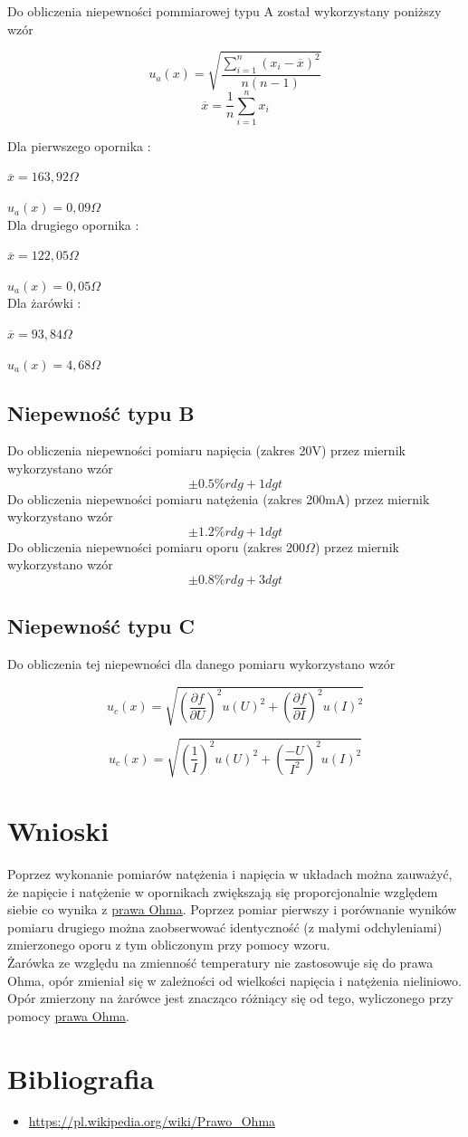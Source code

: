 \documentclass[12pt]{article}
\begin{document}
Do obliczenia niepewności pommiarowej typu A został wykorzystany poniższy wzór

$$ u_a(x) = \sqrt{\frac{\sum\limits_{i=1}^{n}(x_i - \overline{x})^2}{n(n - 1)}} $$
$$ \overline{x} = \frac{1}{n}\sum\limits_{i = 1}^{n}x_i $$

Dla pierwszego opornika : 

$ \overline{x} = 163,92\Omega $

$ u_a(x) = 0,09\Omega $\\

Dla drugiego opornika : 

$ \overline{x} = 122,05\Omega $

$ u_a(x) = 0,05\Omega $\\

Dla żarówki : 

$ \overline{x} = 93,84\Omega $

$ u_a(x) = 4,68\Omega $

\subsection{Niepewność typu B}

Do obliczenia niepewności pomiaru napięcia (zakres 20V) przez miernik wykorzystano wzór
$$ \pm 0.5\% rdg + 1dgt  $$
Do obliczenia niepewności pomiaru natężenia (zakres 200mA) przez miernik wykorzystano wzór
$$ \pm 1.2\% rdg + 1dgt  $$
Do obliczenia niepewności pomiaru oporu (zakres 200$\Omega$) przez miernik wykorzystano wzór
$$ \pm 0.8\% rdg + 3dgt  $$

\subsection{Niepewność typu C}

Do obliczenia tej niepewności dla danego pomiaru wykorzystano wzór

$$ u_c(x) = \sqrt{(\frac{\partial f}{\partial U})^2 u(U)^2 + (\frac{\partial f}{\partial I})^2 u(I)^2 } $$

$$ u_c(x) = \sqrt{(\frac{1}{I})^2 u(U)^2 + (\frac{-U}{I^2})^2 u(I)^2 } $$

\section{Wnioski}
Poprzez wykonanie pomiarów natężenia i napięcia w układach można zauważyć, że napięcie i natężenie
w opornikach
zwiększają się proporcjonalnie względem siebie co wynika z \hyperlink{ohm}{prawa Ohma}. Poprzez
pomiar pierwszy i porównanie wyników pomiaru drugiego można zaobserwować identyczność (z małymi
odchyleniami) zmierzonego oporu z tym obliczonym przy pomocy wzoru. \\
Żarówka ze względu na zmienność temperatury nie zastosowuje się do prawa Ohma, opór zmieniał się 
w zależności od wielkości napięcia i natężenia nieliniowo. Opór zmierzony na żarówce jest znacząco
różniący się od tego, wyliczonego przy pomocy \hyperlink{ohm}{prawa Ohma}.

\section{Bibliografia}
\begin{itemize}
    \item \url{https://pl.wikipedia.org/wiki/Prawo_Ohma}
\end{itemize}
\end{document}
